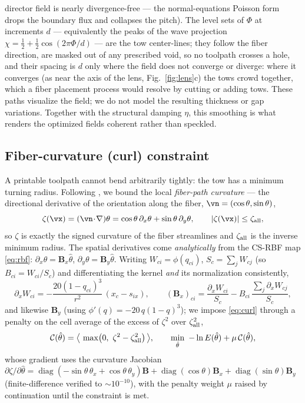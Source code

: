 director field is nearly divergence-free --- the normal-equations Poisson form drops the
boundary flux and collapses the pitch). The level sets of $\Phi$ at increments $d$ ---
equivalently the peaks of the wave projection $\chi=\tfrac12+\tfrac12\cos(2\pi\Phi/d)$ ---
are the tow center-lines; they follow the fiber direction, are masked out
of any prescribed void, so no toolpath crosses a hole, and their spacing is $d$ only where
the field does not converge or diverge: where it converges (as near the axis of the lens,
Fig.~\ref{fig:lens}c) the tows crowd together, which a fiber placement process would
resolve by cutting or adding tows. These paths visualize the field; we do not model the
resulting thickness or gap variations. Together with the structural damping $\eta$,
this smoothing is what renders the optimized fields coherent rather than speckled.

\subsection{Fiber-curvature (curl) constraint}
\label{sec:curl}
A printable toolpath cannot bend arbitrarily tightly: the tow has a minimum
turning radius. Following \cite{wong2025}, we bound the local
\emph{fiber-path curvature} --- the directional derivative of the orientation
along the fiber, $\vn=(\cos\theta,\sin\theta)$,
\begin{equation}
  \zeta(\vx)=(\vn\!\cdot\!\nabla)\theta
  =\cos\theta\,\partial_x\theta+\sin\theta\,\partial_y\theta,\qquad
  |\zeta(\vx)|\le\zeta_{\rm all},
  \label{eq:curl}
\end{equation}
so $\zeta$ is exactly the signed curvature of the fiber streamlines and
$\zeta_{\rm all}$ is the inverse minimum radius. The spatial derivatives come
\emph{analytically} from the CS-RBF map \eqref{eq:rbf}:
$\partial_x\theta=\mathbf B_x\hat\theta$, $\partial_y\theta=\mathbf B_y\hat\theta$.
Writing $W_{ci}=\phi(q_{ci})$, $S_c=\sum_j W_{cj}$ (so $B_{ci}=W_{ci}/S_c$) and
differentiating the kernel \emph{and} its normalization consistently,
\begin{equation}
  \partial_x W_{ci}=-\frac{20(1-q_{ci})^3}{r^2}\,(x_c-s_{ix}),\qquad
  (\mathbf B_x)_{ci}=\frac{\partial_x W_{ci}}{S_c}
  -B_{ci}\,\frac{\sum_j\partial_x W_{cj}}{S_c},
  \label{eq:rbfderiv}
\end{equation}
and likewise $\mathbf B_y$ (using $\phi'(q)=-20\,q(1-q)^3$); we impose
\eqref{eq:curl} through a penalty on the cell average of the excess of $\zeta^2$ over
$\zeta_{\rm all}^2$,
\begin{equation}
  \mathcal C(\hat\theta)=\big\langle\,\max\!\big(0,\ \zeta^2-\zeta_{\rm all}^2\big)\,\big\rangle,
  \qquad
  \min_{\hat\theta}\ -\ln E(\hat\theta)+\mu\,\mathcal C(\hat\theta),
\end{equation}
whose gradient uses the curvature Jacobian
$\partial\zeta/\partial\hat\theta=\operatorname{diag}(-\sin\theta\,\theta_x+\cos
\theta\,\theta_y)\mathbf B+\operatorname{diag}(\cos\theta)\mathbf B_x
+\operatorname{diag}(\sin\theta)\mathbf B_y$ (finite-difference verified to
$\sim\!10^{-10}$), with the penalty weight $\mu$ raised by continuation until the
constraint is met.
